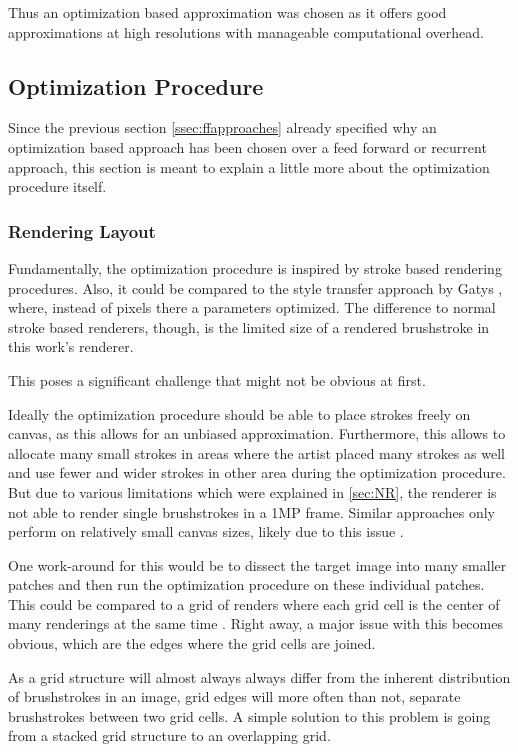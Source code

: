 Thus an optimization based approximation was chosen as it offers good approximations at high resolutions with manageable computational overhead.

\subsection{Optimization Procedure}
Since the previous section \ref{ssec:ffapproaches} already specified why an optimization based approach has been chosen over a feed forward or recurrent approach, this section is meant to explain a little more about the optimization procedure itself.


\subsubsection{Rendering Layout}
Fundamentally, the optimization procedure is inspired by stroke based rendering procedures.
Also, it could be compared to the style transfer approach by Gatys \etal \cite{gatys}, where,  instead of pixels there a parameters optimized.
The difference to normal stroke based renderers, though, is the limited size of a rendered brushstroke in this work's renderer.

This poses a significant challenge that might not be obvious at first.

Ideally the optimization procedure should be able to place strokes freely on canvas, as this allows for an unbiased approximation.
Furthermore, this allows to allocate many small strokes in areas where the artist placed many strokes as well and use fewer and wider strokes in other area during the optimization procedure.
But due to various limitations which were explained in \ref{sec:NR}, the renderer is not able to render single brushstrokes in a 1MP frame. Similar approaches only perform on relatively small canvas sizes, likely due to this issue .

One work-around for this would be to dissect the target image into many smaller patches and then run the optimization procedure on these individual patches.
This could be compared to a grid of renders where each grid cell is the center of many renderings at the same time .
Right away, a major issue with this becomes obvious, which are the edges where the grid cells are joined.

As a grid structure will almost always always differ from the inherent distribution of brushstrokes in an image, grid edges will more often than not, separate brushstrokes between two grid cells.
A simple solution to this problem is going from a stacked grid structure to an overlapping grid. 

